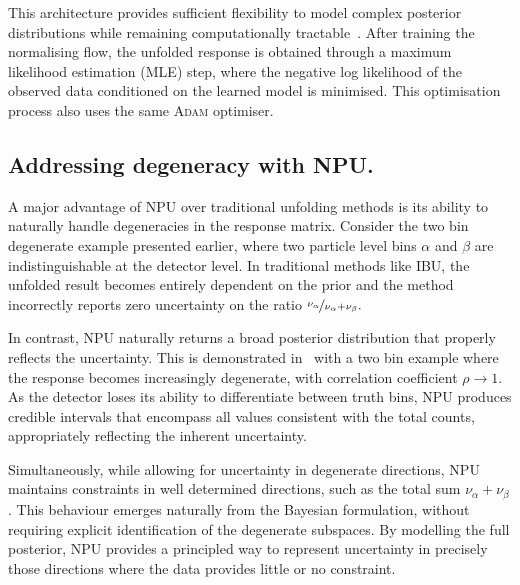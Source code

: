     This architecture provides sufficient flexibility to model complex posterior distributions while remaining computationally tractable~\cite{Rezende2015VariationalFlows, Kobyzev2019NormalizingMethods}.
    After training the normalising flow, the unfolded response is obtained through a maximum likelihood estimation (MLE) step, where the negative log likelihood of the observed data conditioned on the learned model is minimised.
    This optimisation process also uses the same \textsc{Adam} optimiser.
    
\subsection{Addressing degeneracy with NPU.}

    A major advantage of NPU over traditional unfolding methods is its ability to naturally handle degeneracies in the response matrix.
    Consider the two bin degenerate example presented earlier, where two particle level bins $\alpha$ and $\beta$ are indistinguishable at the detector level.
    In traditional methods like IBU, the unfolded result becomes entirely dependent on the prior and the method incorrectly reports zero uncertainty on the ratio \(\nicefrac{\nu_\alpha}{\nu_\alpha+\nu_\beta}.\)

    In contrast, NPU naturally returns a broad posterior distribution that properly reflects the uncertainty.
    This is demonstrated in~\cite{acosta2024npu} with a two bin example where the response becomes increasingly degenerate, with correlation coefficient \(\rho\to 1\).
    As the detector loses its ability to differentiate between truth bins, NPU produces credible intervals that encompass all values consistent with the total counts, appropriately reflecting the inherent uncertainty.
    
    Simultaneously, while allowing for uncertainty in degenerate directions, NPU maintains constraints in well determined directions, such as the total sum $\nu_\alpha + \nu_\beta$.
    This behaviour emerges naturally from the Bayesian formulation, without requiring explicit identification of the degenerate subspaces.
    By modelling the full posterior, NPU provides a principled way to represent uncertainty in precisely those directions where the data provides little or no constraint.

